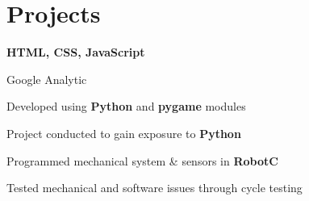 \documentclass[]{morris-cv}
\begin{document}
\begin{minipage}[t]{0.67\textwidth}

\section{Projects}
\vspace{\topsep} %
\begin{tightemize}
\item \textbf{HTML, CSS, JavaScript}
\item Google Analytic
\end{tightemize}
\sectionsep

\vspace{\topsep} %
\begin{tightemize}
\item Developed using \textbf{Python} and \textbf{pygame} modules
\item Project conducted to gain exposure to \textbf{Python}
\end{tightemize}
\sectionsep

\vspace{\topsep} %
\begin{tightemize}
\item Programmed mechanical system \& sensors in \textbf{RobotC}
\item Tested mechanical and software issues through cycle testing
\end{tightemize}
\sectionsep




\end{minipage}
\end{document}
